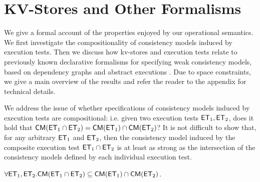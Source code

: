\newcommand{\execs}{\ensuremath{\mathsf{Execs}}}

\section{KV-Stores and Other Formalisms}
\label{sec:other_formalisms}

We give a formal account of the properties enjoyed by our operational 
semantics. We first investigate the compositionality of consistency models 
induced by execution tests. Then we discuss how kv-stores and execution 
tests relate to previously known declarative formalisms for specifying weak 
consistency models, based on dependency graphs \cite{adya} 
and abstract executions \cite{framework-concur}. Due to space 
constraints, we give a main overview of the results and refer the reader to the 
appendix for technical details.


We address the issue of whether specifications of consistency models 
induced by execution tests are compositional:  i.e. given 
two execution tests $\mathsf{ET}_1, \mathsf{ET}_2$, does it hold that 
$\mathsf{CM}(\mathsf{ET}_1 \cap \mathsf{ET}_2) = \mathsf{CM}(\mathsf{ET}_1) \cap \mathsf{CM}(\mathsf{ET}_2)$? 
It is not difficult to show that, for any arbitrary $\mathsf{ET}_1$ and $\mathsf{ET}_2$, 
then the consistency model induced by the composite execution test 
$\mathsf{ET}_1 \cap \mathsf{ET}_2$ is at least as strong as the intersection of the 
consistency models defined by each individual execution test. 
\begin{proposition}
\label{prop:composite_stronger}
$\forall \mathsf{ET}_1, \mathsf{ET}_2.\mathsf{CM}(\mathsf{ET}_1 \cap \mathsf{ET}_2) \subseteq \mathsf{CM}(\mathsf{ET}_1) \cap \mathsf{CM}(\mathsf{ET}_2)$.
\end{proposition}

